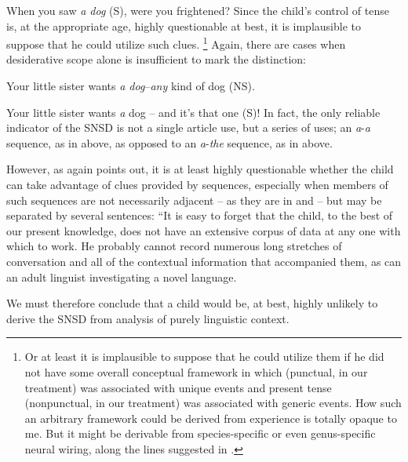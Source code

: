 \ea\label{ex:3:12}
 When you saw \textit{a dog} (S), were you frightened? 
\z
Since the child's control of tense is, at the appropriate age, highly questionable at best, it is implausible to suppose that he could utilize such clues.
\footnote{Or at least it is implausible to suppose that he could utilize them if he did not have some overall conceptual framework in which  (punctual, in our treatment) was associated with unique events and present tense (nonpunctual, in our treatment) was associ\-ated with generic events. How such an arbitrary framework could be derived from experience is totally opaque to me. But it might be derivable from species-specific or even genus-specific neural wiring, along the lines suggested in .}
Again, there are cases when desiderative scope alone is insufficient to mark the distinction:

\ea\label{ex:3:13}
 Your little sister wants \textit{a dog}--\textit{any} kind of dog (NS). 
\z

\ea\label{ex:3:14}
 Your little sister wants \textit{a} dog -- and it's that one (S)! 
\z
In fact, the only reliable indicator of the SNSD is not a single article use, but a series of  uses; an \textit{a}-\textit{a} sequence, as in  above, as opposed to an \textit{a}-\textit{the} sequence, as in  above.

However, as \citet[95]{Maratsos1976} again points out, it is at least highly questionable whether the child can take advantage of clues provided by sequences, especially when members of such sequences are not necessarily adjacent -- as they are in  and  -- but may be separated by several sentences: ``It is easy to forget that the child, to the best of our present knowledge, does not have an extensive corpus of data at any one  with which to work. He probably cannot record numerous long stretches of conversation and all of the con\-textual information that accompanied them, as can an adult linguist investigating a novel language.

We must therefore conclude that a child would be, at best, highly unlikely to derive the SNSD from analysis of purely linguistic context.

